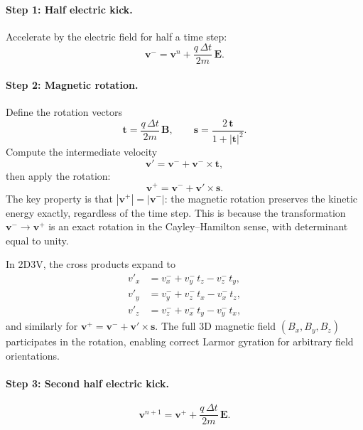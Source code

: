 \documentclass[11pt,a4paper]{report}
\newcommand{\dt}{\Delta t}
\begin{document}
\paragraph{Step 1: Half electric kick.}  Accelerate by the electric field for half a time step:
\begin{equation}
  \mathbf{v}^- = \mathbf{v}^n + \frac{q\,\dt}{2m}\,\mathbf{E}.
  \label{eq:boris-halfkick1}
\end{equation}

\paragraph{Step 2: Magnetic rotation.}  Define the rotation vectors
\begin{equation}
  \mathbf{t} = \frac{q\,\dt}{2m}\,\mathbf{B}, \qquad
  \mathbf{s} = \frac{2\,\mathbf{t}}{1 + |\mathbf{t}|^2}.
  \label{eq:boris-ts}
\end{equation}
Compute the intermediate velocity
\begin{equation}
  \mathbf{v}' = \mathbf{v}^- + \mathbf{v}^- \times \mathbf{t},
  \label{eq:boris-vprime}
\end{equation}
then apply the rotation:
\begin{equation}
  \mathbf{v}^+ = \mathbf{v}^- + \mathbf{v}' \times \mathbf{s}.
  \label{eq:boris-vplus}
\end{equation}
The key property is that $|\mathbf{v}^+| = |\mathbf{v}^-|$: the magnetic rotation preserves the kinetic energy exactly, regardless of the time step.  This is because the transformation $\mathbf{v}^- \to \mathbf{v}^+$ is an exact rotation in the Cayley--Hamilton sense, with determinant equal to unity.

In 2D3V, the cross products expand to
\begin{align}
  v'_x &= v^-_x + v^-_y\,t_z - v^-_z\,t_y, \\
  v'_y &= v^-_y + v^-_z\,t_x - v^-_x\,t_z, \\
  v'_z &= v^-_z + v^-_x\,t_y - v^-_y\,t_x,
\end{align}
and similarly for $\mathbf{v}^+ = \mathbf{v}^- + \mathbf{v}' \times \mathbf{s}$.  The full 3D magnetic field $(B_x, B_y, B_z)$ participates in the rotation, enabling correct Larmor gyration for arbitrary field orientations.

\paragraph{Step 3: Second half electric kick.}
\begin{equation}
  \mathbf{v}^{n+1} = \mathbf{v}^+ + \frac{q\,\dt}{2m}\,\mathbf{E}.
  \label{eq:boris-halfkick2}
\end{equation}
\end{document}
